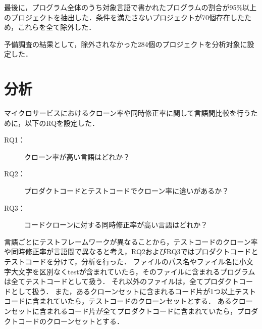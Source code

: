 \documentclass[T,J]{fose}
\begin{document}

最後に，プログラム全体のうち対象言語で書かれたプログラムの割合が95\%以上のプロジェクトを抽出した．条件を満たさないプロジェクトが70個存在したため，これらを全て除外した．

予備調査の結果として，除外されなかった284個のプロジェクトを分析対象に設定した．


\section{分析} \label{sec:analysis}
マイクロサービスにおけるクローン率や同時修正率に関して言語間比較を行うために，以下のRQを設定した．
\begin{description}
    \item[RQ1：] クローン率が高い言語はどれか？
    \item[RQ2：] プロダクトコードとテストコードでクローン率に違いがあるか？
    \item[RQ3：] コードクローンに対する同時修正率が高い言語はどれか？
\end{description}
言語ごとにテストフレームワークが異なることから，テストコードのクローン率や同時修正率が言語間で異なると考え，RQ2およびRQ3ではプロダクトコードとテストコードを分けて，分析を行った．
ファイルのパス名やファイル名に小文字大文字を区別なく{\sf test}が含まれていたら，そのファイルに含まれるプログラムは全てテストコードとして扱う．
それ以外のファイルは，全てプロダクトコードとして扱う．
また，あるクローンセットに含まれるコード片が1つ以上テストコードに含まれていたら，テストコードのクローンセットとする．
あるクローンセットに含まれるコード片が全てプロダクトコードに含まれていたら，プロダクトコードのクローンセットとする．
\end{document}
